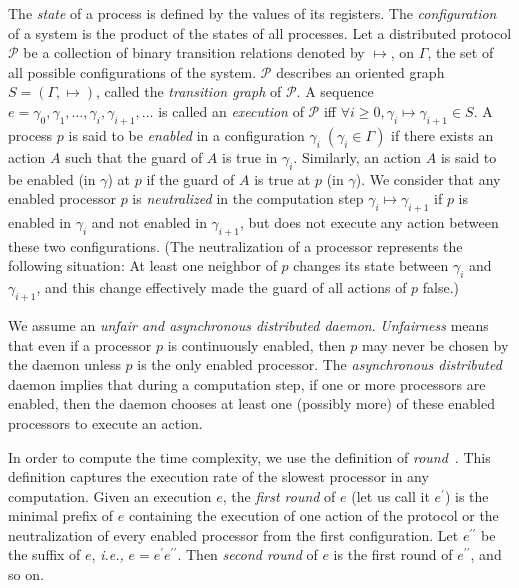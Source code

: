\documentclass[11pt]{article}
\newcommand{\mP}   {\mathcal{P}}
\newcommand{\ie}{\emph{i.e., }}
\begin{document}
The \emph{state} of a process is defined by the values of its registers.
The \emph{configuration} of a system is the product of the states of all processes. 
Let a distributed protocol $\mP$ be a collection of binary transition
relations denoted by $\mapsto $, on $\Gamma$, the set of all
possible configurations of the system.  $\mP$ describes an
oriented graph $S=(\Gamma, \mapsto)$, called the \emph{transition graph} of $\mP$.
A sequence $e=\gamma_0, \gamma_1, \ldots, \gamma_i,\gamma_{i+1},\ldots$ is called an
\emph{execution} of $\mP$ iff $\forall i\geq 0, \gamma_{i}\mapsto \gamma _{i+1} \in S$. 
A process $p$ is said to be \emph{enabled} in a configuration
$\gamma_i \;( \gamma _i\in \Gamma)$ if there exists an action $A$ such that 
the guard of $A$ is true in $\gamma_i$.  
Similarly, an action $A$ is said to be enabled (in $\gamma$) at $p$
if the guard of $A$ is true at $p$ (in $\gamma$).
We consider that any enabled processor $p$ is \emph{neutralized} 
in the computation step $\gamma_i \mapsto \gamma_{i+1}$ if $p$ is enabled in 
$\gamma_i$ and not enabled in $\gamma_{i+1}$, but does not execute any action
between these two configurations.  (The neutralization of a processor represents the
following situation: At least one neighbor of $p$ changes its state between 
$\gamma_i$ and $\gamma_{i+1}$, and this change effectively made the guard of 
all actions of $p$ false.)

We assume an \emph{unfair and asynchronous distributed daemon}. 
\emph{Unfairness} means that even if a 
processor $p$ is continuously enabled, then $p$ may never be chosen by 
the daemon unless $p$ is the only enabled processor.
The \emph{asynchronous distributed} daemon implies that 
during a computation step, if one or more processors are enabled, then the 
daemon chooses at least one (possibly more) of these enabled processors to 
execute an action.



In order to compute the time complexity, we use the definition of
\emph{round}~\cite{DIM97a}.  This definition captures the execution rate of 
the slowest processor in any computation.
Given an execution $e$, the \emph{first round} of $e$ 
(let us call it $e^{\prime}$)
is the minimal prefix of $e$ containing the execution of one action 
of the protocol or the neutralization of every enabled processor from the first configuration.  
Let $e^{\prime \prime}$ be the suffix of $e$, \ie $e=e^{\prime}e^{\prime \prime}$.  
Then \emph{second round} of $e$ is the first round of $e^{\prime \prime}$, and so on.
\end{document}
